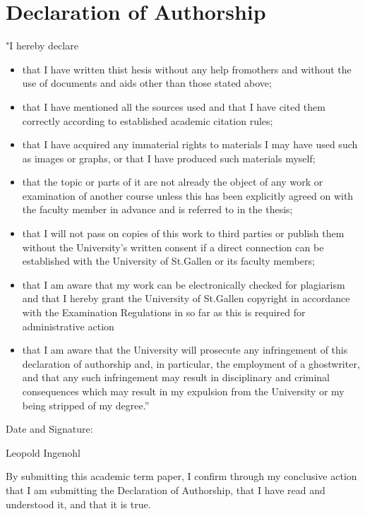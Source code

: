 \documentclass[12pt]{article}
\begin{document}
\section*{Declaration of Authorship}
"I hereby declare 
\begin{itemize}
	\item that I have written thist hesis without any help fromothers and without the use of documents and aids other than those stated above;
	\item that I have mentioned all the sources used and that I have cited them correctly	according to established academic citation rules;
	\item that I have acquired any immaterial rights to materials I may have used such as images or graphs, or that I have produced such materials myself;
	\item that the topic or parts of it are not already the object of any work or examination of another course unless this has been explicitly agreed on with the faculty member in advance and is referred to in the thesis;
	\item that I will not pass on copies of this work to third parties or publish them without the University’s written consent if a direct connection can be established with the University of St.Gallen or its faculty members;
	\item that I am aware that my work can be electronically checked for plagiarism and that I hereby grant the University of St.Gallen copyright in accordance with the Examination Regulations in so far as this is required for administrative action
	\item that I am aware that the University will prosecute any infringement of this declaration of authorship and, in particular, the employment of a ghostwriter, and that any such infringement may result in disciplinary and criminal consequences which may result in my expulsion from the University or my being stripped of my degree.”
\end{itemize} 

Date and Signature: \hrulefill

\hspace*{0mm}\phantom{Date and Signature: }Leopold Ingenohl\par
\vspace{0.5cm}
\noindent\small By submitting this academic term paper, I confirm through my conclusive action that I am submitting the Declaration of Authorship, that I have read and understood it, and that it is true.
\end{document}
